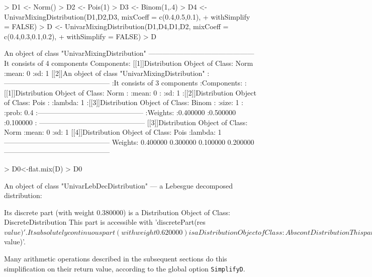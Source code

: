 \documentclass[11pt]{article}
\newcommand{\code}[1]{{\tt #1}}
\begin{document}
\begin{Schunk}
\begin{Sinput}
> D1 <- Norm()
> D2 <- Pois(1)
> D3 <- Binom(1,.4)
> D4 <- UnivarMixingDistribution(D1,D2,D3, mixCoeff = c(0.4,0.5,0.1),
+       withSimplify = FALSE)
> D <- UnivarMixingDistribution(D1,D4,D1,D2, mixCoeff = c(0.4,0.3,0.1,0.2),
+       withSimplify = FALSE)
> D
\end{Sinput}
\begin{Soutput}
An object of class "UnivarMixingDistribution"
 ---------------------------------------------
 It consists of  4 components
 Components:
 [[1]]Distribution Object of Class: Norm
       :mean: 0
       :sd: 1
 [[2]]An object of class "UnivarMixingDistribution"
       :---------------------------------------------
       :It consists of  3 components
       :Components:
       :[[1]]Distribution Object of Class: Norm
       :      :mean: 0
       :      :sd: 1
       :[[2]]Distribution Object of Class: Pois
       :      :lambda: 1
       :[[3]]Distribution Object of Class: Binom
       :      :size: 1
       :      :prob: 0.4
       :---------------------------------------------
       :Weights:
       :0.400000       :0.500000       :0.100000       :
 ---------------------------------------------
 [[3]]Distribution Object of Class: Norm
       :mean: 0
       :sd: 1
 [[4]]Distribution Object of Class: Pois
       :lambda: 1
 ---------------------------------------------
 Weights:
 0.400000 0.300000 0.100000 0.200000
 ---------------------------------------------
\end{Soutput}
\begin{Sinput}
> D0<-flat.mix(D)
> D0
\end{Sinput}
\begin{Soutput}
An object of class "UnivarLebDecDistribution"
 --- a Lebesgue decomposed distribution:

    Its discrete part (with weight 0.380000) is a
 Distribution Object of Class: DiscreteDistribution
 This part is accessible with 'discretePart(res$value)'.

    Its absolutely continuous part (with weight 0.620000) is a
 Distribution Object of Class: AbscontDistribution
 This part is accessible with 'acPart(res$value)'.
\end{Soutput}
\end{Schunk}

Many arithmetic operations described in the subsequent sections do
this simplification on their return value, according to the global option
\code{SimplifyD}.
\end{document}
